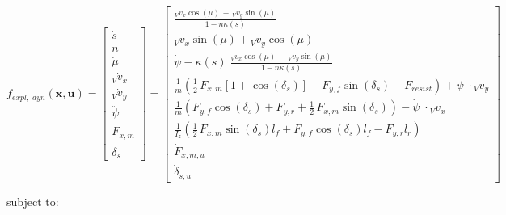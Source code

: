 \documentclass[
a4paper, %
10pt, %
notitlepage,
english]{CSUniSchoolLabReport}
\begin{document}
\begin{equation}
	f_{expl,\;dyn}(\mathbf{x}, \mathbf{u}) =
	\left[\begin{array}{c}
		
		\dot{s} \\ 
		
		\dot{n} \\ 
		
		\dot{\mu} \\
		
		{}_V\dot{v}_x \\
		
		{}_V\dot{v}_y \\
		
		\ddot{\psi}\;\;\; \\
		
		\dot{F}_{x,m} \\
		
		\dot{\delta}_s
		
	\end{array}\right] =
	\left[\begin{array}{c}
		
		\frac{{}_V v_x \cos(\mu) \,-\, {}_V v_y \sin(\mu)}{1 - n \kappa(s)} \\
		
		{}_V v_x \sin(\mu) + {}_V v_y \cos(\mu) \\
 
		\dot{\psi} - \kappa(s)\;\frac{{}_V v_x \cos(\mu) \,-\, {}_V v_y \sin(\mu)}{1 - n \kappa(s)} \\
		
		\frac{1}{m}  \left( \frac{1}{2} \, F_{x, m} \left[1 + \cos(\delta_s)\right] - F_{y, f} \sin(\delta_s) - F_{resist} \right) + \dot{\psi}\;\cdot {}_V v_y \\
		
		\frac{1}{m}  \left( F_{y, f} \cos(\delta_s) + F_{y, r} + \frac{1}{2} \, F_{x, m} \sin(\delta_s) \right) - \dot{\psi}\;\cdot {}_V v_x \\
		
		\frac{1}{I_z}  \left( \frac{1}{2} \, F_{x, m} \sin(\delta_s) l_f + F_{y, f} \cos(\delta_s) l_f - F_{y, r} l_r \right) \\
		
		\dot{F}_{x,m,u} \\
		
		\dot{\delta}_{s,u}
	\end{array}\right]
\end{equation}

subject to:\\
\end{document}
